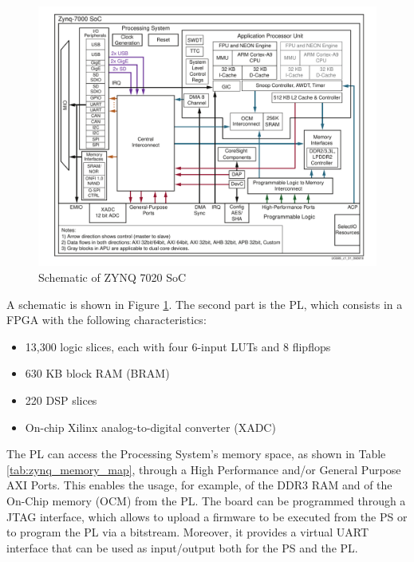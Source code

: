 \begin{figure}[H]
\centering
\includegraphics[width=1.0\linewidth]{images/chapter3/zynq.pdf}
\caption{Schematic of ZYNQ 7020 SoC}
\label{fig:zynq7020}
\end{figure}

A schematic is shown in Figure \ref{fig:zynq7020}. The second part is the PL, which consists in a FPGA with the following characteristics:

\begin{itemize}
    \item 13,300 logic slices, each with four 6-input LUTs and 8 flipflops
    \item 630 KB block RAM (BRAM)
    \item 220 DSP slices
    \item On-chip Xilinx analog-to-digital converter (XADC)
\end{itemize}

The PL can access the Processing System's memory space, as shown in Table \ref{tab:zynq_memory_map}, through a High Performance and/or General Purpose AXI Ports. This enables the usage, for example, of the DDR3 RAM and of the On-Chip memory (OCM) from the PL. The board can be programmed through a JTAG interface, which allows to upload a firmware to be executed from the PS or to program the PL via a bitstream. Moreover, it provides a virtual UART interface that can be used as input/output both for the PS and the PL.\bigskip

